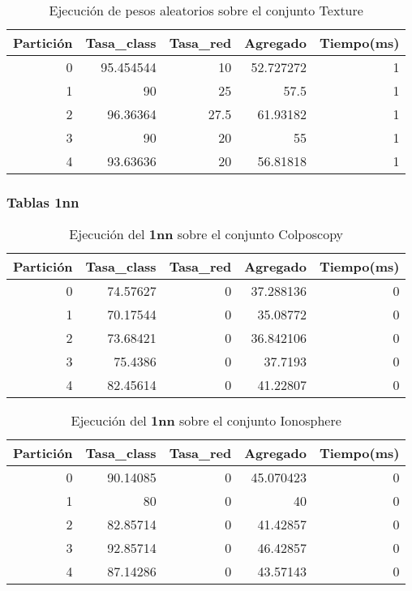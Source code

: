 \documentclass[size=a4, parskip=half, titlepage=false, toc=flat, toc=bib, 12pt]{scrartcl}
\begin{document}
 \begin{table}[ht]
  \centering
  \begin{tabular}[t]{rrrrr}
  \toprule
  Partición &Tasa\_class &Tasa\_red & Agregado & Tiempo(ms)\\
  \midrule
0         & 95.454544 & 10       & 52.727272 & 1      \\
1         & 90        & 25       & 57.5      & 1      \\
2         & 96.36364  & 27.5     & 61.93182  & 1      \\
3         & 90        & 20       & 55        & 1      \\
4         & 93.63636  & 20       & 56.81818  & 1      \\
  \bottomrule
  \end{tabular}
  \caption{Ejecución de pesos aleatorios sobre el conjunto Texture}
  \end{table}%

\newpage
\subsubsection{Tablas 1nn}

 \begin{table}[ht]
  \centering
  \begin{tabular}[t]{rrrrr}
  \toprule
  Partición &Tasa\_class &Tasa\_red & Agregado & Tiempo(ms)\\
  \midrule
0         & 74.57627  & 0        & 37.288136 & 0      \\
1         & 70.17544  & 0        & 35.08772  & 0      \\
2         & 73.68421  & 0        & 36.842106 & 0      \\
3         & 75.4386   & 0        & 37.7193   & 0      \\
4         & 82.45614  & 0        & 41.22807  & 0      \\
  \bottomrule
  \end{tabular}
  \caption{Ejecución del \textbf{1nn} sobre el conjunto Colposcopy }
  \end{table}%

 \begin{table}[ht]
  \centering
  \begin{tabular}[t]{rrrrr}
  \toprule
  Partición &Tasa\_class &Tasa\_red & Agregado & Tiempo(ms)\\
  \midrule
0         & 90.14085  & 0        & 45.070423 & 0      \\
1         & 80        & 0        & 40        & 0      \\
2         & 82.85714  & 0        & 41.42857  & 0      \\
3         & 92.85714  & 0        & 46.42857  & 0      \\
4         & 87.14286  & 0        & 43.57143  & 0      \\
  \bottomrule
  \end{tabular}
  \caption{Ejecución del \textbf{1nn} sobre el conjunto Ionosphere}
  \end{table}%
\end{document}
